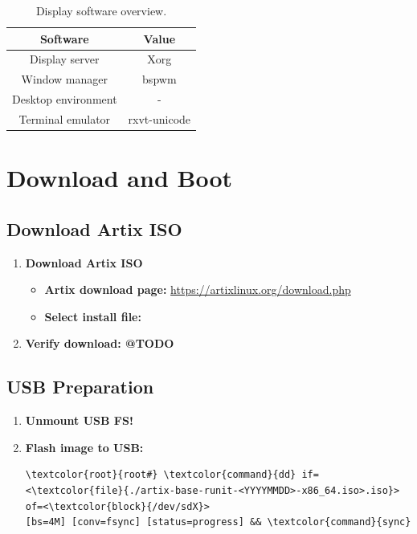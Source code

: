 \documentclass[10pt, a4paper, onecolumn, oneside, titlepage, openany]{book}
\begin{document}
\begin{table}[!ht]
\centering
\begin{tabular}{|c|c|}
    \hline
    \textbf{Software} & \textbf{Value} \\
    \hline
    Display server & Xorg\\
    Window manager & bspwm\\
    Desktop environment & -\\
    Terminal emulator & rxvt-unicode\\
    \hline
\end{tabular}
\caption{Display software overview.}
\label{table:3}
\end{table}


\chapter{Download and Boot}
\section{Download Artix ISO}
\begin{enumerate}
    \item \textbf{Download Artix ISO}
    \begin{itemize}
        \item \textbf{Artix download page:}
\newline \url{https://artixlinux.org/download.php}
        \item \textbf{Select install file:}
\newline {}
    \end{itemize}
    \item \textbf{Verify download: @TODO}
\end{enumerate}

\section{USB Preparation}
\begin{enumerate}
    \item \textbf{Unmount USB FS!}
    \item \textbf{Flash image to USB:}
\begin{Verbatim}[commandchars=\\\{\}]
\textcolor{root}{root#} \textcolor{command}{dd} if=<\textcolor{file}{./artix-base-runit-<YYYYMMDD>-x86_64.iso>.iso}> of=<\textcolor{block}{/dev/sdX}>
[bs=4M] [conv=fsync] [status=progress] && \textcolor{command}{sync}
\end{Verbatim}
\end{enumerate}
\end{document}
